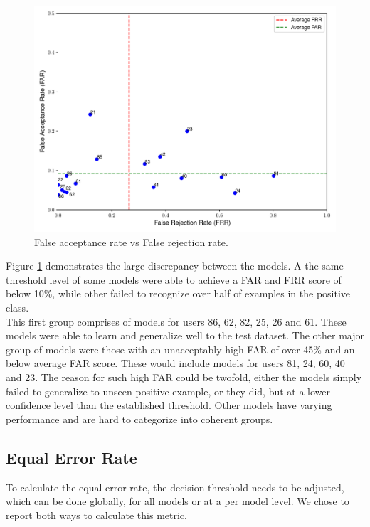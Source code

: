 \begin{figure}[H]
	\centering
	\includegraphics[width=\textwidth]{images/far_vs_frr.pdf} 	
	\caption{False acceptance rate vs False rejection rate.}
	\label{fig:frr_vs_far_all_models_base}
\end{figure}

Figure \ref{fig:frr_vs_far_all_models_base} demonstrates the large discrepancy between the models. A the same threshold level of some models were able to achieve a FAR and FRR score of below 10\%, while other failed to recognize over half of examples in the positive class. \\
This first group comprises of models for users 86, 62, 82, 25, 26 and 61. These models were able to learn and generalize well to the test dataset.
The other major group of models were those with an unacceptably high FAR of over 45\% and an below average FAR score. These would include models for users 81, 24, 60, 40 and 23. The reason for such high FAR could be twofold, either the models simply failed to generalize to unseen positive example, or they did, but at a lower confidence level than the established threshold. Other models have varying performance and are hard to categorize into coherent groups.

\subsection{Equal Error Rate} \label{subsec_eer}
To calculate the equal error rate, the decision threshold needs to be adjusted, which can be done globally, for all models or at a per model level. We chose to report both ways to calculate this metric. 

